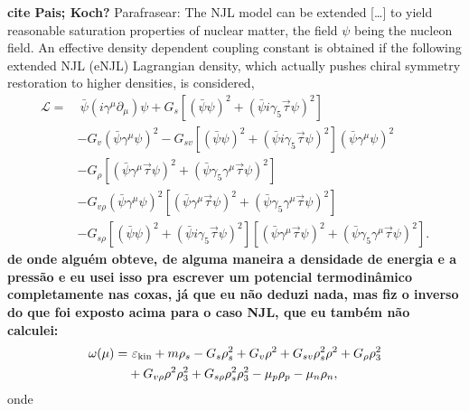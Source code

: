 \documentclass[prc, reprint, amsmath, linenumbers,10pt]{revtex4-1}
\begin{document}
\textbf{cite Pais; Koch?}
Parafrasear:
The NJL model can be extended [\dots] to yield reasonable saturation properties of nuclear matter, the field $\psi$ being the nucleon field. An effective density dependent coupling constant is obtained if the following extended NJL (eNJL) Lagrangian density, which actually pushes chiral symmetry restoration to higher densities, is considered,
\begin{equation}\label{Eq:Lagrangiana_eNLJ_Pais}
\begin{split}
	\mathcal{L} =&~ \bar{\psi}(i\gamma^\mu\partial_\mu)\psi + G_s[(\bar{\psi}\psi)^2 + (\bar{\psi}i\gamma_5\vec{\tau}\psi)^2] \\
	& - G_v(\bar{\psi}\gamma^\mu\psi)^2 - G_{sv}[(\bar{\psi}\psi)^2 + (\bar{\psi}i\gamma_5\vec{\tau}\psi)^2](\bar{\psi}\gamma^\mu\psi)^2 \\
	& - G_\rho[(\bar{\psi}\gamma^\mu\vec{\tau}\psi)^2 + (\bar{\psi}\gamma_5\gamma^\mu\vec{\tau}\psi)^2] \\
	& - G_{v\rho}(\bar{\psi}\gamma^\mu\psi)^2[(\bar{\psi}\gamma^\mu\vec{\tau}\psi)^2 + (\bar{\psi}\gamma_5\gamma^\mu\vec{\tau}\psi)^2] \\
	& - G_{s\rho} [(\bar{\psi}\psi)^2 + (\bar{\psi}i\gamma_5\vec{\tau}\psi)^2][(\bar{\psi}\gamma^\mu\vec{\tau}\psi)^2 + (\bar{\psi}\gamma_5\gamma^\mu\vec{\tau}\psi)^2].
\end{split}
\end{equation}
%
\textbf{de onde alguém obteve, de alguma maneira a densidade de energia e a pressão e eu usei isso pra escrever um potencial termodinâmico completamente nas coxas, já que eu não deduzi nada, mas fiz o inverso do que foi exposto acima para o caso NJL, que eu também não calculei:}
\begin{equation}\label{Eq:potencial_termodinamico}
\begin{split}
	\omega(\mu) =&~ \varepsilon_{\rm{kin}} + m\rho_s - G_s\rho_s^2 + G_v\rho^2 + G_{sv}\rho_s^2\rho^2 + G_\rho\rho_3^2 \\
	&+ G_{v\rho}\rho^2\rho_3^2 + G_{s\rho}\rho_s^2\rho_3^2 - \mu_p\rho_p - \mu_n\rho_n,
\end{split}
\end{equation}
%
onde
\end{document}
